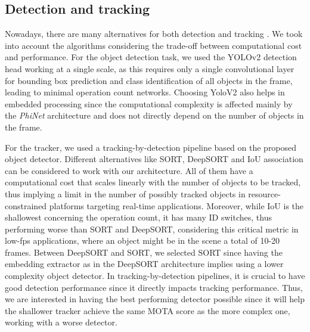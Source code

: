 \subsection{Detection and tracking}
\label{sec:dettrack}
Nowadays, there are many alternatives for both detection \cite{he2017mask, bochkovskiy2020yolov4, liu2016ssd} and tracking \cite{zhang2020fairmot, bewley2016simple, wojke2017simple}. We took into account the algorithms considering the trade-off between computational cost and performance. For the object detection task, we used the YOLOv2 \cite{redmon2017yolo9000} detection head working at a single scale, as this requires only a single convolutional layer for bounding box prediction and class identification of all objects in the frame, leading to minimal operation count networks. Choosing YoloV2 also helps in embedded processing since the computational complexity is affected mainly by the \textit{PhiNet} architecture and does not directly depend on the number of objects in the frame.

For the tracker, we used a tracking-by-detection pipeline based on the proposed object detector. Different alternatives like SORT, DeepSORT and IoU association can be considered to work with our architecture. All of them have a computational cost that scales linearly with the number of objects to be tracked, thus implying a limit in the number of possibly tracked objects in resource-constrained platforms targeting real-time applications.
Moreover, while IoU is the shallowest concerning the operation count, it has many ID switches, thus performing worse than SORT and DeepSORT, considering this critical metric in low-fps applications, where an object might be in the scene a total of 10-20 frames. Between DeepSORT and SORT, we selected SORT since having the embedding extractor as in the DeepSORT architecture implies using a lower complexity object detector. In tracking-by-detection pipelines, it is crucial to have good detection performance since it directly impacts tracking performance. Thus, we are interested in having the best performing detector possible since it will help the shallower tracker achieve the same MOTA score as the more complex one, working with a worse detector. 

